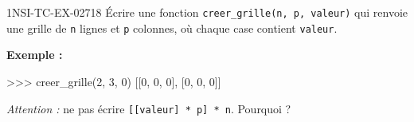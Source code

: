 \begin{exercice}{1NSI-TC-EX-027}{1}{8}
Écrire une fonction \lstinline{creer_grille(n, p, valeur)} qui renvoie une grille
de \lstinline{n} lignes et \lstinline{p} colonnes, où chaque case contient
\lstinline{valeur}.

\textbf{Exemple :}
\begin{console}
>>> creer_grille(2, 3, 0)
[[0, 0, 0], [0, 0, 0]]
\end{console}

\textit{Attention :} ne pas écrire \lstinline{[[valeur] * p] * n}. Pourquoi ?
\end{exercice}
